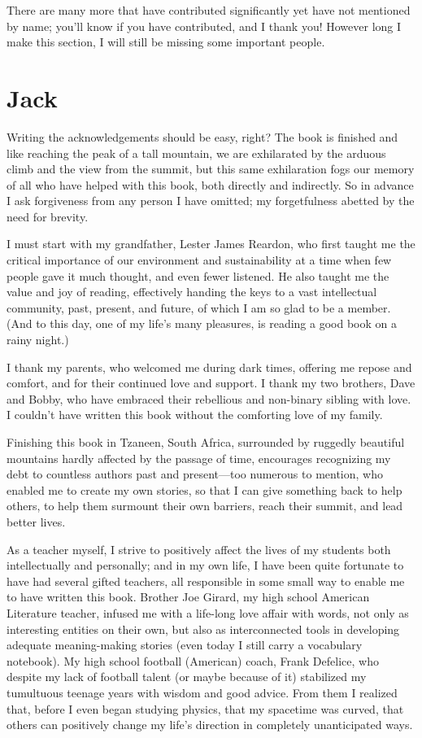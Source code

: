 There are many more that have contributed significantly yet have not mentioned by name; you'll know if you have contributed, and I thank you! However long I make this section, I will still be missing some important people.


\section*{Jack}
Writing the acknowledgements should be easy, right? The book is finished and like reaching the peak of a tall mountain, we are exhilarated by the arduous climb and the view from the summit, but this same exhilaration fogs our memory of all who have helped with this book, both directly and indirectly. So in advance I ask forgiveness from any person I have omitted; my forgetfulness abetted by the need for brevity.  


I must start with my grandfather, Lester James Reardon, who first taught me the critical importance of our environment and sustainability at a time when few people gave it much thought, and even fewer listened. He also taught me the value and joy of reading, effectively handing the keys to a vast intellectual community, past, present, and future, of which I am so glad to be a member. (And to this day, one of my life’s many pleasures, is reading a good book on a rainy night.)


I thank my parents, who welcomed me during dark times, offering me repose and comfort, and for their continued love and support. I thank my two brothers, Dave and Bobby, who have embraced their rebellious and non-binary sibling with love. I couldn’t have written this book without the comforting love of my family.


Finishing this book in Tzaneen, South Africa, surrounded by ruggedly beautiful mountains hardly affected by the passage of time, encourages recognizing my debt to countless authors past and present—too numerous to mention, who enabled me to create my own stories, so that I can give something back to help others, to help them surmount their own barriers, reach their summit, and lead better lives.  


As a teacher myself, I strive to positively affect the lives of my students both intellectually and personally; and in my own life, I have been quite fortunate to have had several gifted teachers, all responsible in some small way to enable me to have written this book.  Brother Joe Girard, my high school American Literature teacher, infused me with a life-long love affair with words, not only as interesting entities on their own, but also as interconnected tools in developing adequate meaning-making stories (even today I still carry a vocabulary notebook). My high school football (American) coach, Frank Defelice, who despite my lack of football talent (or maybe because of it) stabilized my tumultuous teenage years with wisdom and good advice. From them I realized that, before I even began studying physics, that my spacetime was curved, that others can positively change my life’s direction in completely unanticipated ways. 


